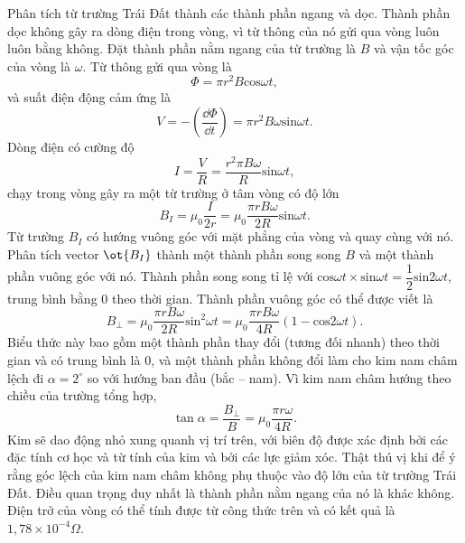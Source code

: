 \begin{loigiai}
Phân tích từ trường Trái Đất thành các thành phần ngang và dọc. Thành phần dọc không gây ra dòng điện trong vòng, vì từ thông của nó gửi qua vòng luôn luôn bằng không. Đặt thành phần nằm ngang của từ trường là $B$ và vận tốc góc của vòng là  $\omega$. Từ thông gửi qua vòng là
$$\Phi=\pi{r^2}B\mathrm{cos}\omega t,$$
và suất điện động cảm ứng là $$ V=-\left(\dfrac{\dd\Phi}{\dd t}\right)=\pi{r^2}B\omega\mathrm{sin}\omega t.$$ Dòng điện có cường độ
$$ I=\dfrac{V}{R}=\dfrac{r^2\pi B\omega}{R}\mathrm{sin}\omega t,$$
chạy trong vòng gây ra một từ trường ở tâm vòng có độ lớn
$$B_I=\mu_0\dfrac{I}{2r}=\mu_0\dfrac{\pi rB\omega}{2R}\mathrm{sin}\omega t.$$
Từ trường $B_I$ có hướng vuông góc với mặt phẳng của vòng và quay cùng với nó. Phân tích vector $\ot{B_I}$ thành một thành phần song song $B$ và một thành phần vuông góc với nó. Thành phần song song tỉ lệ với $\mathrm{cos}\omega t\times\mathrm{sin}\omega t=\dfrac{1}{2}\mathrm{sin} 2\omega t$, trung bình bằng $0$ theo thời gian. Thành phần vuông góc có thể được viết là
$$B_{\bot}=\mu_0\dfrac{\pi rB\omega}{2R}{\mathrm{sin}^2}\omega t=\mu_0\dfrac{\pi rB\omega}{4R}\left(1-\mathrm{cos} 2\omega t\right).$$
Biểu thức này bao gồm một thành phần thay đổi (tương đối nhanh) theo thời gian và có trung bình là $0$, và một thành phần không đổi làm cho kim nam châm lệch đi  $\alpha = 2 ^\circ$ so với hướng ban đầu (bắc – nam). Vì kim nam châm hướng theo chiều của trường tổng hợp,
$$\tan\alpha=\dfrac{B_{\bot}}{B}=\mu_0\dfrac{\pi r\omega}{4R}.$$
Kim sẽ dao động nhỏ xung quanh vị trí trên, với biên độ được xác định bởi các đặc tính cơ học và từ tính của kim và bởi các lực giảm xóc. Thật thú vị khi để ý rằng góc lệch của kim nam châm không phụ thuộc vào độ lớn của từ trường Trái Đất. Điều quan trọng duy nhất là thành phần nằm ngang của nó là khác không. Điện trở của vòng có thể tính được từ công thức trên và có kết quả là $ 1,78\times{10^{-4}}\Omega.$
\end{loigiai}


